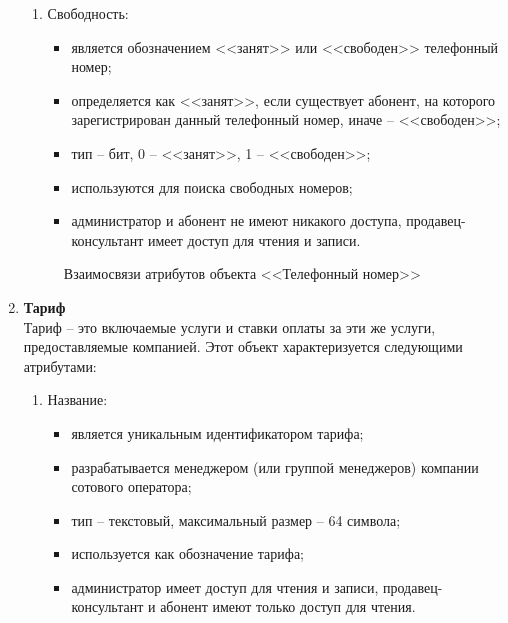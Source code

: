 \begin{enumerate}
\begin{enumerate}
        \item Свободность:
        \begin{itemize}
            \item является обозначением <<занят>> или <<свободен>> телефонный номер;
            \item определяется как <<занят>>, если существует абонент, на которого зарегистрирован данный телефонный номер, иначе -- <<свободен>>;
            \item тип -- бит, 0 -- <<занят>>, 1 -- <<свободен>>;
            \item используются для поиска свободных номеров;
            \item администратор и абонент не имеют никакого доступа, продавец-консультант имеет доступ для чтения и записи.
        \end{itemize}
    \end{enumerate}
    \begin{figure}[H]
        \label{fig:telephone-number-attributes}
        \caption{Взаимосвязи атрибутов объекта <<Телефонный номер>>}
    \end{figure}

    \item \textbf{Тариф} \\
    Тариф -- это включаемые услуги и ставки оплаты за эти же услуги, предоставляемые компанией. Этот объект характеризуется следующими атрибутами:
    \begin{enumerate}
        \item Название:
        \begin{itemize}
            \item является уникальным идентификатором тарифа;
            \item разрабатывается менеджером (или группой менеджеров) компании сотового оператора;
            \item тип -- текстовый, максимальный размер -- 64 символа;
            \item используется как обозначение тарифа;
            \item администратор имеет доступ для чтения и записи, продавец-консультант и абонент имеют только доступ для чтения.
        \end{itemize}


\end{enumerate}
\end{enumerate}

